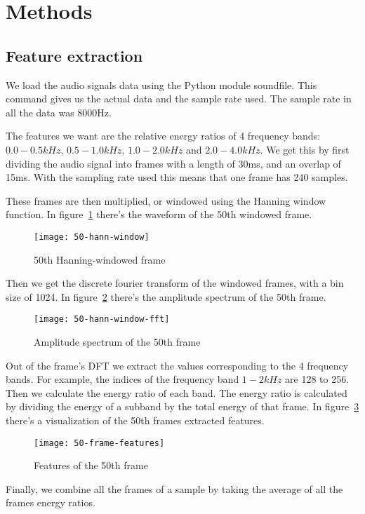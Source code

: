 \section{Methods}

\subsection{Feature extraction}
We load the audio signals data using the Python module soundfile. This command
gives us the actual data and the sample rate used. The sample rate in all the
data was 8000Hz.

The features we want are the relative energy ratios of 4 frequency bands:
\(0.0 - 0.5 kHz\), \(0.5 - 1.0 kHz\), \(1.0 - 2.0 kHz\) and \(2.0 - 4.0 kHz\).
We get this by first dividing the audio signal into frames with a length of
30ms, and an overlap of 15ms. With the sampling rate used this means that one
frame has 240 samples.

These frames are then multiplied, or windowed using the Hanning window
function. In figure~\ref{fig:hann50} there's the waveform of the 50th windowed
frame.
\begin{figure}[h]
  \centering
  \texttt{[image: 50-hann-window]}
  \caption{50th Hanning-windowed frame}
\label{fig:hann50}
\end{figure}

Then we get the discrete fourier transform of the windowed frames,
with a bin size of 1024. In figure~\ref{fig:amp_spec} there's the amplitude
spectrum of the 50th frame.
\begin{figure}[h]
  \centering
  \texttt{[image: 50-hann-window-fft]}
  \caption{Amplitude spectrum of the 50th frame}
\label{fig:amp_spec}
\end{figure}

Out of the frame's DFT we extract the values corresponding to the 4 frequency
bands. For example, the indices of the frequency band \(1-2 kHz\) are 128 to
256. Then we calculate the energy ratio of each band. The energy ratio is
calculated by dividing the energy of a subband by the total energy of that
frame. In figure~\ref{fig:features} there's a visualization of the 50th frames
extracted features.
\begin{figure}[h]
  \centering
  \texttt{[image: 50-frame-features]}
  \caption{Features of the 50th frame}
\label{fig:features}
\end{figure}
Finally, we combine all the frames of a sample by taking the average of all the
frames energy ratios.



